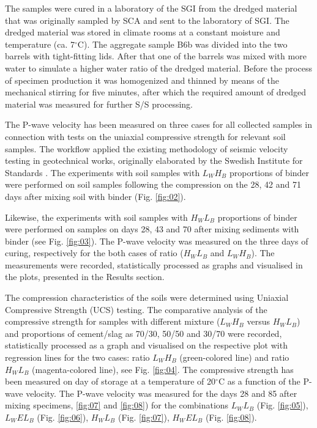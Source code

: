 \documentclass[10pt,twoside,twocolumn,a4paper]{article}
\begin{document}
The samples were cured in a laboratory of the SGI from the dredged material that was originally sampled by SCA and sent to the laboratory of SGI. The dredged material was stored in climate rooms at a constant moisture and temperature (ca. 7$^{\circ}$C). The aggregate sample B6b was divided into the two barrels with tight-fitting lids. After that one of the barrels was mixed with more water to simulate a higher water ratio of the dredged material. Before the process of specimen production it was homogenized and thinned by means of the mechanical stirring for five minutes, after which the required amount of dredged material was measured for further S/S processing.

The P-wave velocity has been measured on three cases for all collected samples in connection with tests on the uniaxial compressive strength  for relevant soil samples. The workflow applied the existing methodology of seismic velocity testing in geotechnical works, originally elaborated by the Swedish Institute for Standards \cite{SIS2018a,SIS2019}. The experiments with soil samples with $L_WH_B$ proportions of binder were performed on soil samples following the compression on the 28, 42 and 71 days after mixing soil with binder (Fig. \ref{fig:02}). 

Likewise, the experiments with soil samples with $H_WL_B$ proportions of binder were performed on samples on days 28, 43 and 70 after mixing sediments with binder (see Fig. \ref{fig:03}). The P-wave velocity was measured on the three days of curing, respectively for the both cases of ratio ($H_WL_B$ and $L_WH_B$). The measurements were recorded, statistically processed as graphs and visualised in the plots, presented in the Results section. 

The compression characteristics of the soils were determined using Uniaxial Compressive Strength (UCS) testing. The comparative analysis of the compressive strength for samples with different mixture ($L_WH_B$ versus $H_WL_B$) and proportions of cement/slag as 70/30, 50/50 and 30/70 were recorded, statistically processed as a graph and visualised on the respective plot with regression lines for the two cases: ratio $L_WH_B$ (green-colored line) and ratio $H_WL_B$ (magenta-colored line), see Fig. \ref{fig:04}. The compressive strength has been measured on day  of storage at a temperature of 20$^{\circ}$C as a function of the P-wave velocity. The P-wave velocity was measured for the days 28 and 85 after mixing specimens, \ref{fig:07} and \ref{fig:08}) for the combinations $L_WL_B$ (Fig. \ref{fig:05}), $L_WEL_B$ (Fig. \ref{fig:06}), $H_WL_B$ (Fig. \ref{fig:07}), $H_WEL_B$ (Fig. \ref{fig:08}). 
\end{document}
